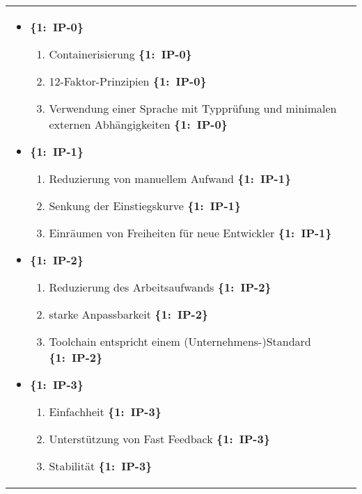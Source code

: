 \begin{longtable}{ >{\raggedright\bfseries}p{} p{} }
{\begin{itemize}
            \item \mbox{\textbf{\{1: IP-0\}}}
            \begin{enumerate}
                \item Containerisierung \mbox{\textbf{\{1: IP-0\}}}
                \item 12-Faktor-Prinzipien \mbox{\textbf{\{1: IP-0\}}}
                \item Verwendung einer Sprache mit Typprüfung und minimalen externen Abhängigkeiten \mbox{\textbf{\{1: IP-0\}}}
            \end{enumerate}
            \item \mbox{\textbf{\{1: IP-1\}}}
            \begin{enumerate}
                \item Reduzierung von manuellem Aufwand \mbox{\textbf{\{1: IP-1\}}}
                \item Senkung der Einstiegskurve \mbox{\textbf{\{1: IP-1\}}}
                \item Einräumen von Freiheiten für neue Entwickler \mbox{\textbf{\{1: IP-1\}}}
            \end{enumerate}
            \item \mbox{\textbf{\{1: IP-2\}}}
            \begin{enumerate}
                \item Reduzierung des Arbeitsaufwands \mbox{\textbf{\{1: IP-2\}}}
                \item starke Anpassbarkeit \mbox{\textbf{\{1: IP-2\}}}
                \item Toolchain entspricht einem (Unternehmens-)Standard \mbox{\textbf{\{1: IP-2\}}}
            \end{enumerate}
            \item \mbox{\textbf{\{1: IP-3\}}}
            \begin{enumerate}
                \item Einfachheit \mbox{\textbf{\{1: IP-3\}}}
                \item Unterstützung von Fast Feedback \mbox{\textbf{\{1: IP-3\}}}
                \item Stabilität \mbox{\textbf{\{1: IP-3\}}}
            \end{enumerate}
        \end{itemize}
    } \\
\end{longtable}

\clearpage

